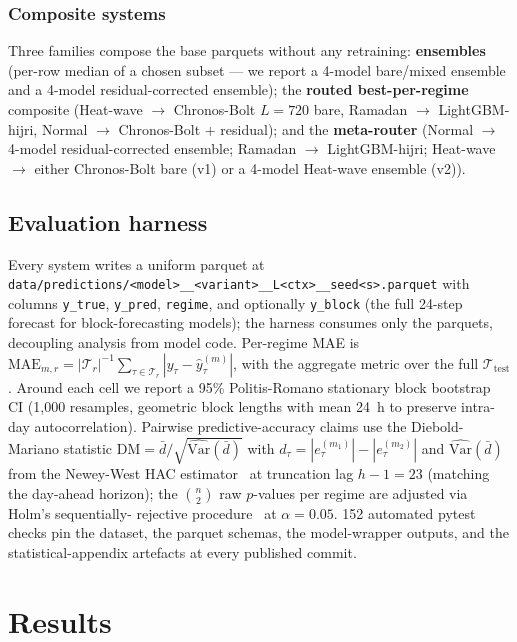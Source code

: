 \documentclass[10pt, a4paper, twocolumn]{article}
\begin{document}
\subsubsection{Composite systems}

Three families compose the base parquets without any retraining:
\textbf{ensembles} (per-row median of a chosen subset --- we
report a 4-model bare/mixed ensemble and a 4-model
residual-corrected ensemble); the \textbf{routed best-per-regime}
composite (Heat-wave $\to$ Chronos-Bolt $L{=}720$ bare,
Ramadan $\to$ LightGBM-hijri, Normal $\to$ Chronos-Bolt +
residual); and the \textbf{meta-router} (Normal $\to$ 4-model
residual-corrected ensemble; Ramadan $\to$ LightGBM-hijri;
Heat-wave $\to$ either Chronos-Bolt bare (v1) or a 4-model
Heat-wave ensemble (v2)).

\subsection{Evaluation harness}

Every system writes a uniform parquet at
\texttt{data/predictions/<model>\_\_<variant>\allowbreak\_\_L<ctx>\_\_seed<s>.parquet}
with columns \texttt{y\_true}, \texttt{y\_pred}, \texttt{regime},
and optionally \texttt{y\_block} (the full 24-step forecast for
block-forecasting models); the harness consumes only the
parquets, decoupling analysis from model code. Per-regime MAE is
$\mathrm{MAE}_{m, r} = |\mathcal{T}_r|^{-1}\sum_{\tau \in
\mathcal{T}_r}|y_\tau - \hat{y}^{(m)}_\tau|$, with the aggregate
metric over the full $\mathcal{T}_{\mathrm{test}}$. Around each
cell we report a 95\% Politis-Romano stationary block
bootstrap~\cite{politis1994bootstrap} CI (1{,}000 resamples,
geometric block lengths with mean 24~h to preserve intra-day
autocorrelation). Pairwise predictive-accuracy claims use the
Diebold-Mariano statistic
$\mathrm{DM} = \bar{d}/\sqrt{\widehat{\mathrm{Var}}(\bar{d})}$
with $d_\tau = |e^{(m_1)}_\tau| - |e^{(m_2)}_\tau|$ and
$\widehat{\mathrm{Var}}(\bar{d})$ from the Newey-West HAC
estimator~\cite{newey1987hac} at truncation lag $h-1 = 23$
(matching the day-ahead horizon); the $\binom{n}{2}$ raw
$p$-values per regime are adjusted via Holm's sequentially-
rejective procedure~\cite{holm1979sequential} at $\alpha =
0.05$. 152 automated pytest checks pin the dataset, the parquet
schemas, the model-wrapper outputs, and the statistical-appendix
artefacts at every published commit.

\section{Results}
\label{sec:results}
\end{document}
